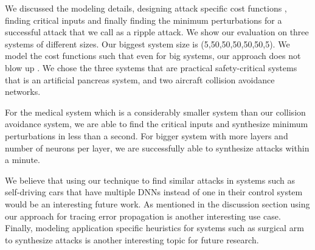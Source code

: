 We discussed the modeling details, designing attack specific cost functions , finding critical inputs and finally finding the minimum perturbations for a successful attack that we call as a ripple attack. We show our evaluation on three systems of different sizes. Our biggest system size is (5,50,50,50,50,50,5). We model the cost functions such that even for big systems, our approach does not blow up . We chose the three systems that are practical safety-critical systems that is an artificial pancreas system, and two aircraft collision avoidance networks.

For the medical system which is a considerably smaller system than our collision avoidance system, we are able to find the critical inputs and synthesize minimum perturbations in less than a second. For bigger system with more layers and number of neurons per layer, we are successfully able to synthesize attacks within a minute. 

We believe that using our technique to find similar attacks in systems such as self-driving cars that have multiple DNNs instead of one in their control system would be an interesting future work. As mentioned in the discussion section using our approach for tracing error propagation is another interesting use case. Finally, modeling application specific heuristics for systems such as surgical arm to synthesize attacks is another interesting topic for future research. 
\fi 
%